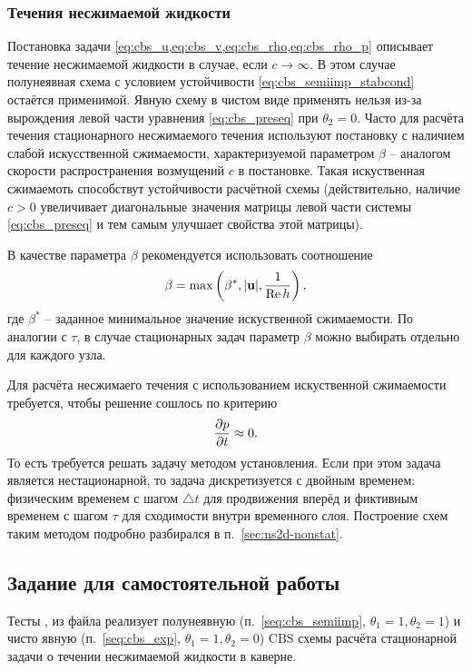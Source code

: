 \subsubsection{Течения несжимаемой жидкости}
Постановка задачи \cref{eq:cbs_u,eq:cbs_v,eq:cbs_rho,eq:cbs_rho_p}
описывает течение несжимаемой жидкости в случае, если $c\to\infty$.
В этом случае полунеявная схема с условием устойчивости \cref{eq:cbs_semiimp_stabcond} остаётся применимой.
Явную схему в чистом виде применять нельзя из-за вырождения
левой части уравнения \cref{eq:cbs_preseq} при $\theta_2 = 0$.
Часто для расчёта течения стационарного несжимаемого течения
используют постановку с наличием слабой искусственной сжимаемости, характеризуемой параметром $\beta$
-- аналогом скорости распространения возмущений $c$ в  постановке.
Такая искуственная сжимаемоть способствут устойчивости расчётной схемы
(действительно, наличие $c>0$ увеличивает диагональные
значения матрицы левой части системы \cref{eq:cbs_preseq} и тем самым улучшает свойства этой матрицы).

В качестве параметра $\beta$ рекомендуется использовать соотношение
$$
\beta = \max\left(\beta^*, |\boldsymbol{\rm u}|, \frac{1}{\mathrm{Re}\, h}\right),
$$
где $\beta^*$ -- заданное минимальное значение искуственной сжимаемости.
По аналогии с $\tau$, в случае стационарных задач
параметр $\beta$ можно выбирать отдельно для каждого узла.

Для расчёта несжимаего течения
с использованием искуственной сжимаемости требуется, чтобы решение сошлось
по критерию
$$
\frac{\partial p}{\partial t} \approx 0.
$$
То есть требуется решать задачу методом установления.
Если при этом задача является нестационарной, то задача
дискретизуется с
двойным временем: физическим временем с шагом $\triangle t$
для продвижения вперёд и 
фиктивным временем с шагом $\tau$ для сходимости
внутри временного слоя. Построение схем
таким методом подробно разбирался в п.~\ref{sec:ns2d-nonstat}.


\subsection{Задание для самостоятельной работы}
Тесты , 
из файла 
реализует полунеявную (п.~\ref{seq:cbs_semiimp}, $\theta_1 = 1, \theta_2 = 1$) 
и чисто явную (п.~\ref{seq:cbs_exp}, $\theta_1 = 1, \theta_2 = 0$) CBS схемы
расчёта стационарной задачи
о течении несжимаемой жидкости в каверне.

